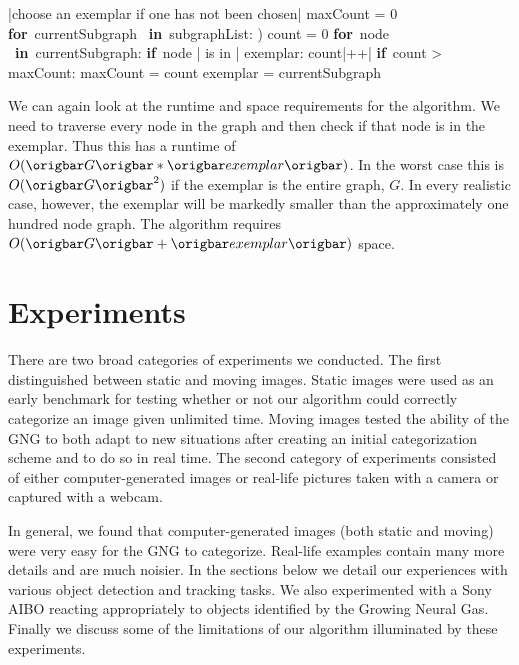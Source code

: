 \documentclass{article}
\renewcommand{\|}{\origbar} %
\renewcommand{\FOR}{\mbox{{\bf for} }\tab}
\renewcommand{\IF}{\mbox{{\bf if} }\tab}
\newcommand{\IN}{\mbox{ {\bf in} }}
\begin{document}
\begin{Algorithm}[h!]
\begin{program}
  |choose an exemplar if one has not been chosen|
  maxCount = 0
  \FOR currentSubgraph \IN subgraphList: )
    count = 0
    \FOR node \IN currentSubgraph:
      \IF node | is in | exemplar:
        count|++| \untab \untab
    \IF count > maxCount:
      maxCount = count
      exemplar = currentSubgraph
\end{program}
\caption{Pseudocode for Tracking Subgraphs}
\label{alg:trackingSubgraphs}
\end{Algorithm}

We can again look at the runtime and space requirements for the algorithm. We need to traverse every node in the graph and then check if that node is in the exemplar. Thus this has a runtime of $O(\|G\|*\|exemplar\|)$. In the worst case this is $O(\|G\|^2)$ if the exemplar is the entire graph, $G$. In every realistic case, however, the exemplar will be markedly smaller than the approximately one hundred node graph. The algorithm requires $O(\|G\|+\|exemplar\|)$ space.

\section{Experiments}
\label{sec:experiments}


There are two broad categories of experiments we conducted. The first distinguished between static and moving images. Static images were used as an early benchmark for testing whether or not our algorithm could correctly categorize an image given unlimited time. Moving images tested the ability of the GNG to both adapt to new situations after creating an initial categorization scheme and to do so in real time. The second category of experiments consisted of either computer-generated images or real-life pictures taken with a camera or captured with a webcam. 

In general, we found that computer-generated images (both static and moving) were very easy for the GNG to categorize. Real-life examples contain many more details and are much noisier. In the sections below we detail our experiences with various object detection and tracking tasks. We also experimented with a Sony AIBO reacting appropriately to objects identified by the Growing Neural Gas. Finally we discuss some of the limitations of our algorithm illuminated by these experiments.
\end{document}
